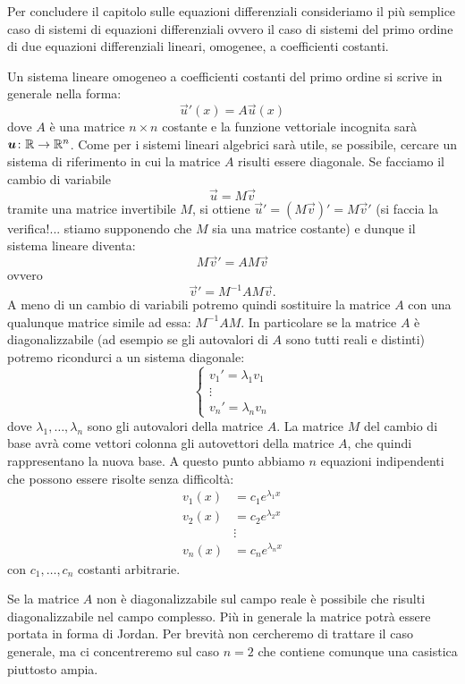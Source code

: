 Per concludere il capitolo sulle equazioni differenziali consideriamo il più
semplice caso di sistemi di equazioni differenziali ovvero il caso di sistemi del
primo ordine di due equazioni differenziali lineari, omogenee, a coefficienti costanti.

Un sistema lineare omogeneo a coefficienti costanti del primo ordine si
scrive in generale nella forma:
\[
  \vec u'(x) = A \vec u(x)
\]
dove $A$ è una matrice $n\times n$ costante
e la funzione vettoriale incognita sarà
$\boldsymbol u \colon \mathbb R\to \mathbb R^n$.
Come per i sistemi lineari algebrici sarà utile, se possibile,
cercare un sistema di riferimento
in cui la matrice $A$ risulti essere diagonale. Se facciamo il cambio di variabile
\[
  \vec u = M \vec v
\]
tramite una matrice invertibile $M$, si ottiene $\vec u' = (M \vec v)' = M \vec v'$
(si faccia la verifica!... stiamo supponendo che $M$ sia una matrice costante)
e dunque il sistema lineare diventa:
\[
 M \vec v' = A M \vec v
\]
ovvero
\[
  \vec v' = M^{-1} A M \vec v.
\]
A meno di un cambio di variabili potremo quindi sostituire la matrice $A$
con una qualunque matrice simile ad essa: $M^{-1} A M$. In particolare se
la matrice $A$ è diagonalizzabile (ad esempio se gli autovalori di $A$ sono
tutti reali e distinti)
potremo ricondurci a un sistema diagonale:
\[
\begin{cases}
 v_1' = \lambda_1 v_1 \\
      \vdots\\
 v_n' = \lambda_n v_n
\end{cases}
\]
dove $\lambda_1, \dots, \lambda_n$ sono gli autovalori della matrice $A$.
La matrice $M$ del cambio di base avrà come vettori colonna gli autovettori
della matrice $A$, che quindi rappresentano la nuova base. A questo punto
abbiamo $n$ equazioni indipendenti che possono essere risolte
senza difficoltà:
\begin{align*}
  v_1(x) &= c_1 e^{\lambda_1 x}\\
  v_2(x) &= c_2 e^{\lambda_2 x}\\
  &\vdots \\
  v_n(x) &= c_n e^{\lambda_n x}
\end{align*}
con $c_1, \dots, c_n$ costanti arbitrarie.

Se la matrice $A$ non è diagonalizzabile sul campo reale è possibile che
risulti diagonalizzabile nel campo complesso. Più in generale la matrice
potrà essere portata in forma di Jordan. Per brevità non cercheremo di
trattare il caso generale, ma ci concentreremo sul caso $n=2$ che
contiene comunque una casistica piuttosto ampia.

